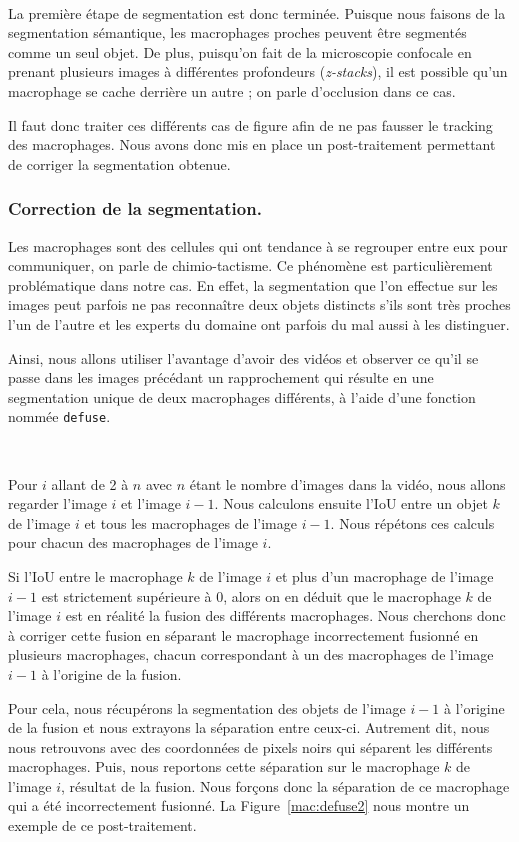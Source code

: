 \documentclass[a4paper,12pt]{report}
\newcommand{\figref}[1]{Figure~\ref{#1}}
\begin{document}
\

La première étape de segmentation est donc terminée. Puisque nous faisons de la segmentation sémantique, les macrophages proches peuvent être segmentés comme un seul objet. De plus, puisqu'on fait de la microscopie confocale en prenant plusieurs images à différentes profondeurs (\textit{z-stacks}), il est possible qu'un macrophage se cache derrière un autre ; on parle d'occlusion dans ce cas.

Il faut donc traiter ces différents cas de figure afin de ne pas fausser le tracking des macrophages. Nous avons donc mis en place un post-traitement permettant de corriger la segmentation obtenue.

\subsubsection*{Correction de la segmentation.}
Les macrophages sont des cellules qui ont tendance à se regrouper entre eux pour communiquer, on parle de chimio-tactisme. Ce phénomène est particulièrement problématique dans notre cas. En effet, la segmentation que l'on effectue sur les images peut parfois ne pas reconnaître deux objets distincts s'ils sont très proches l'un de l'autre et les experts du domaine ont parfois du mal aussi à les distinguer.

Ainsi, nous allons utiliser l'avantage d'avoir des vidéos et observer ce qu'il se passe dans les images précédant un rapprochement qui résulte en une segmentation unique de deux macrophages différents, à l'aide d'une fonction nommée \texttt{defuse}.

\

Pour $i$ allant de 2 à $n$ avec $n$ étant le nombre d'images dans la vidéo, nous allons regarder l'image $i$ et l'image $i-1$. Nous calculons ensuite l'IoU entre un objet $k$ de l'image $i$ et tous les macrophages de l'image $i-1$. Nous répétons ces calculs pour chacun des macrophages de l'image $i$.

Si l'IoU entre le macrophage $k$ de l'image $i$ et plus d'un macrophage de l'image $i-1$ est strictement supérieure à 0, alors on en déduit que le macrophage $k$ de l'image $i$ est en réalité la fusion des différents macrophages. Nous cherchons donc à corriger cette fusion en séparant le macrophage incorrectement fusionné en plusieurs macrophages, chacun correspondant à un des macrophages de l'image $i-1$ à l'origine de la fusion.

Pour cela, nous récupérons la segmentation des objets de l'image $i-1$ à l'origine de la fusion et nous extrayons la séparation entre ceux-ci. Autrement dit, nous nous retrouvons avec des coordonnées de pixels noirs qui séparent les différents macrophages. Puis, nous reportons cette séparation sur le macrophage $k$ de l'image $i$, résultat de la fusion. Nous forçons donc la séparation de ce macrophage qui a été incorrectement fusionné. La \figref{mac:defuse2} nous montre un exemple de ce post-traitement.
\end{document}
